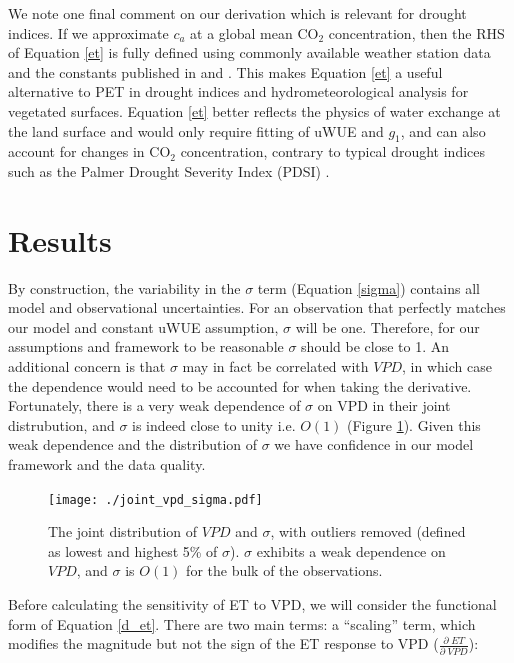 \documentclass[draft,linenumbers]{agujournal}
\begin{document}
We note one final comment on our derivation which is relevant for
drought indices. If we approximate $c_a$ at a global mean CO$_2$
concentration, then the RHS of Equation \ref{et} is fully defined
using commonly available weather station data and the constants
published in \citet{Zhou_2015} and \citet{Lin_2015}. This makes
Equation \ref{et} a useful alternative to PET in drought indices and
hydrometeorological analysis for vegetated surfaces. Equation \ref{et}
better reflects the physics of water exchange at the land surface and
would only require fitting of uWUE and $g_1$, and can also account for
changes in CO$_2$ concentration, contrary to typical drought indices
such as the Palmer Drought Severity Index (PDSI) \citep{Swann_2016}.




\section{Results}
\label{results}

By construction, the variability in the $\sigma$ term (Equation
\ref{sigma}) contains all model and observational uncertainties. For
an observation that perfectly matches our model and constant uWUE
assumption, $\sigma$ will be one. Therefore, for our assumptions and
framework to be reasonable $\sigma$ should be close to 1. An
additional concern is that $\sigma$ may in fact be correlated with
$VPD$, in which case the dependence would need to be accounted for
when taking the derivative. Fortunately, there is a very weak
dependence of $\sigma$ on VPD in their joint distrubution, and
$\sigma$ is indeed close to unity i.e. $O(1)$ (Figure
\ref{joint_vpd_sigma}). Given this weak dependence and the
distribution of $\sigma$ we have confidence in our model framework and
the data quality.

\begin{figure} \centering
\texttt{[image: ./joint\_vpd\_sigma.pdf]}
\caption{The joint distribution of $VPD$ and $\sigma$, with outliers
removed (defined as lowest and highest 5\% of $\sigma$). $\sigma$
exhibits a weak dependence on $VPD$, and $\sigma$ is $O(1)$ for the
bulk of the observations.}
\label{joint_vpd_sigma}
\end{figure}

Before calculating the sensitivity of ET to VPD, we will consider the
functional form of Equation \ref{d_et}. There are two main terms: a
``scaling'' term, which modifies the magnitude but not the sign of the
ET response to VPD ($\frac{\partial \; ET}{\partial \; VPD}$):
\end{document}
